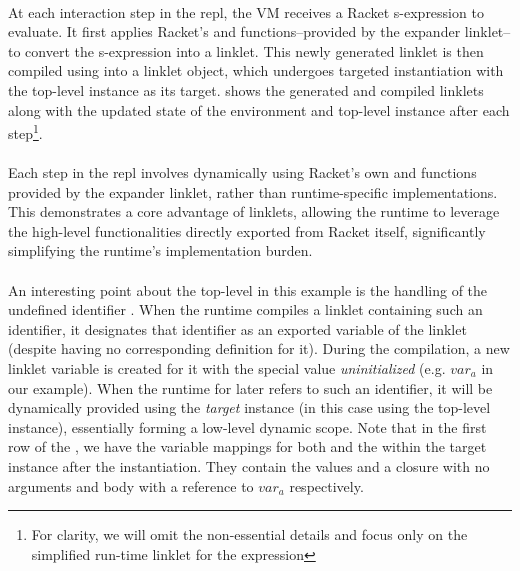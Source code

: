 		\paragraph{}%
			At each interaction step in the \gls{repl}, the VM receives a Racket s-expression to evaluate. It first applies Racket's  and  functions--provided by the expander linklet--to convert the s-expression into a linklet. This newly generated linklet is then compiled using  into a linklet object, which undergoes targeted instantiation with the top-level instance as its target.  shows the generated and compiled linklets along with the updated state of the environment and top-level instance after each step\footnote{For clarity, we will omit the non-essential details and focus only on the simplified run-time linklet for the expression}.


		\paragraph{}%
			Each step in the \gls{repl} involves dynamically using Racket's own  and  functions provided by the expander linklet, rather than runtime-specific implementations. This demonstrates a core advantage of linklets, allowing the runtime to leverage the high-level functionalities directly exported from Racket itself, significantly simplifying the runtime's implementation burden.

		\paragraph{}%
			An interesting point about the top-level in this example is the handling of the undefined identifier . When the runtime compiles a linklet containing such an identifier, it designates that identifier as an exported variable of the linklet (despite having no corresponding definition for it). During the compilation, a new linklet variable is created for it with the special value \emph{uninitialized} (e.g. $var_a$ in our example). When the runtime for later refers to such an identifier, it will be dynamically provided using the \emph{target} instance (in this case using the top-level instance), essentially forming a low-level dynamic scope. Note that in the first row of the , we have the variable mappings for both  and the  within the target instance after the instantiation. They contain the values  and a closure with no arguments and body with a reference to $var_a$ respectively.

